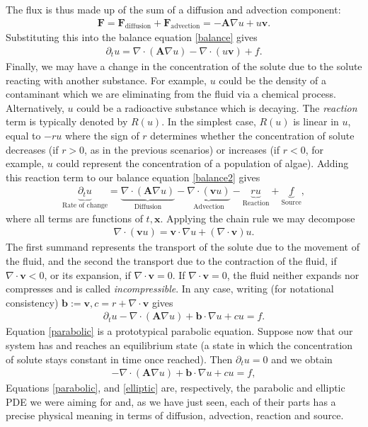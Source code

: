 \documentclass[
    a4paper,
    DIV=14,
    abstract=true,
    numbers=noenddot
]{scrartcl}
\begin{document}
The flux is thus made up of the sum of a diffusion and advection component:
\begin{align*}
	\bm{F}=\bm{F}_{\text{diffusion} }+ \bm{F}_{\text{advection} } =- \bm{A}\nabla u+ u \bm{v}   .
\end{align*}
Substituting  this into the balance equation \eqref{balance} gives
\begin{align}\label{balance2}
	\partial_t u=\nabla \cdot (\bm{A}\nabla u) -\nabla \cdot  (u \bm{v})+ f.
\end{align}
Finally, we may have a change in the concentration of the solute due to the solute reacting with another substance. For example, $u$ could be the density of a contaminant which we are eliminating from the fluid via a chemical process. Alternatively, $u$ could be a radioactive substance which is decaying. The \emph{reaction} term is typically denoted by  $R(u)$. In the simplest case, $R(u)$ is linear in  $u$, equal to  $-ru$ where the sign of $r$ determines whether the concentration of solute decreases (if $r>0$, as in the previous scenarios) or increases (if $r<0$, for example, $u$ could represent the concentration of a population of algae). Adding this reaction term to our balance equation \eqref{balance2} gives
\begin{align*}
	\underbrace{\partial_t u}_{\text{Rate of change} }= \underbrace{\nabla \cdot (\bm{A}\nabla u)}_{\text{Diffusion}} - \underbrace{\nabla \cdot ( \bm{v}u)}_{\text{Advection}} -\underbrace{ru}_{\text{Reaction}}  +\underbrace{f}_{\text{Source}},
\end{align*}
where all terms are functions of $t,\bm{x}$. Applying the chain rule we may decompose
\begin{align*}
	\nabla \cdot ( \bm{v}u)= \bm{v}\cdot \nabla u+ (\nabla \cdot \bm{v})u .
\end{align*}
The first summand represents the transport of the solute due to the movement of the fluid, and the second the transport due to the contraction of the fluid, if $\nabla \cdot \bm{v}<0$, or its expansion, if $\nabla \cdot \bm{v}=0$. If $\nabla \cdot \bm{v} =0$, the fluid neither expands nor compresses and is called \emph{incompressible}. In any case, writing (for notational consistency) $\bm{b} :=\bm{v}, c=r+\nabla \cdot \bm{v} $ gives
\begin{align}\label{parabolic}
	\partial_t u-\nabla \cdot (\bm{A}\nabla u) +\bm{b} \cdot \nabla u + c u= f  .
\end{align}
Equation \eqref{parabolic} is a prototypical parabolic equation. Suppose now that our system has and reaches an equilibrium state (a state in which the concentration of solute stays constant in time once reached). Then $\partial _t u=0$ and we obtain
\begin{align}\label{elliptic}
	-\nabla \cdot (\bm{A}\nabla u) + \bm{b} \cdot \nabla u+cu = f,
\end{align}
Equations \eqref{parabolic}, and \eqref{elliptic} are, respectively, the parabolic and elliptic PDE we were aiming for and, as we have just seen, each of their parts has a precise physical meaning in terms of diffusion, advection, reaction and source.
\end{document}
